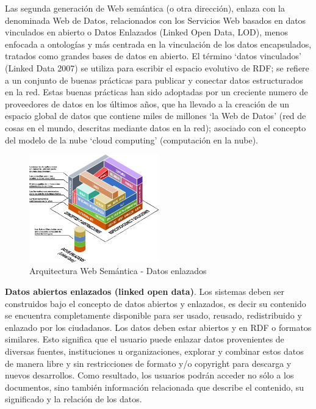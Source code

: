 \documentclass[conference]{IEEEtran}\usepackage[]{graphicx}\usepackage[]{color}
\begin{document}
Las segunda generación de Web semántica (o otra dirección), enlaza con la denominada Web de Datos, relacionados con los Servicios Web basados en datos vinculados en abierto o  Datos Enlazados (Linked Open Data, LOD), menos enfocada a ontologías y más centrada en la vinculación de los datos encapsulados, tratados como grandes bases de datos en abierto.  El término ‘datos vinculados’ (Linked Data 2007) se utiliza para escribir el espacio evolutivo de RDF; se refiere a un conjunto de buenas prácticas para publicar y conectar datos estructurados en la red. Estas buenas prácticas han sido adoptadas por un creciente numero de proveedores de datos en los últimos años, que ha llevado a la creación de un espacio global de datos que contiene miles de millones ‘la Web de Datos’ (red de cosas en el mundo, descritas mediante datos en la red); asociado con el concepto del modelo de la nube ‘cloud computing’ (computación en la nube).
\begin{figure}[h]
	\centering
	\includegraphics[width=0.5\textwidth]{ws-arquitectura1}
	\caption{Arquitectura Web Semántica - Datos enlazados}
\end{figure}
\textbf{Datos abiertos enlazados (linked open data)}. Los sistemas deben ser construidos bajo el concepto de datos abiertos y enlazados, es decir su contenido se encuentra completamente disponible para ser usado, reusado, redistribuido y enlazado por los ciudadanos. Los datos deben estar abiertos y en RDF o formatos similares. Esto significa que el usuario puede enlazar datos provenientes de diversas fuentes, instituciones u organizaciones, explorar y combinar estos datos de manera libre y sin restricciones de formato y/o copyright para descarga y nuevos desarrollos. Como resultado, los usuarios podrán acceder no sólo a los documentos, sino también información relacionada que describe el contenido, su significado y la relación de los datos. 


\end{document}
